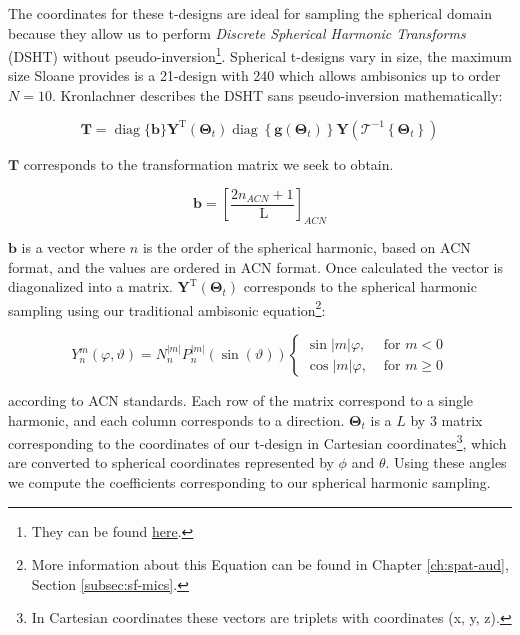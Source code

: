
The coordinates for these t-designs are ideal for sampling the spherical domain because they allow us to perform \textit{Discrete Spherical Harmonic Transforms} (DSHT) without pseudo-inversion\footnote{They can be found \href{http://neilsloane.com/sphdesigns/}{here}.}. Spherical t-designs vary in size, the maximum size Sloane provides is a 21-design with 240 which allows ambisonics up to order $N = 10$. Kronlachner describes the DSHT sans pseudo-inversion mathematically:

\begin{equation}
\boldsymbol{T}=\operatorname{diag}\{\boldsymbol{b}\} \boldsymbol{Y}^{\mathrm{T}}\left(\boldsymbol{\Theta}_{t}\right) \operatorname{diag}\left\{\boldsymbol{g}\left(\boldsymbol{\Theta}_{t}\right)\right\} \boldsymbol{Y}\left(\mathcal{T}^{-1}\left\{\boldsymbol{\Theta}_{t}\right\}\right)
\end{equation}
 
$\textbf{T}$ corresponds to the transformation matrix we seek to obtain.

\begin{equation}
\boldsymbol{b}=\left[\frac{2 n_{A C N}+1}{\mathrm{~L}}\right]_{A C N}
\end{equation}

$\boldsymbol{b}$ is a vector where $n$ is the order of the spherical harmonic, based on ACN format, and the values are ordered in ACN format. Once calculated the vector is diagonalized into a matrix. $\boldsymbol{Y}^{\mathrm{T}}\left(\boldsymbol{\Theta}_{t}\right)$ corresponds to the spherical harmonic sampling using our traditional ambisonic equation\footnote{More information about this Equation can be found in Chapter \ref{ch:spat-aud}, Section \ref{subsec:sf-mics}.}:

$$
Y_{n}^{m}(\varphi, \vartheta)=N_{n}^{|m|} P_{n}^{|m|}(\sin (\vartheta))\left\{\begin{array}{ll}
\sin |m| \varphi, & \text { for } m<0 \\
\cos |m| \varphi, & \text { for } m \geq 0
\end{array}\right.
$$


according to ACN standards. Each row of the matrix correspond to a single harmonic, and each column corresponds to a direction. $\boldsymbol{\Theta}_{t}$ is a $L$ by 3 matrix corresponding to the coordinates of our t-design in Cartesian coordinates\footnote{In Cartesian coordinates these vectors are triplets with coordinates (x, y, z).}, which are converted to spherical coordinates represented by $\phi$ and $\theta$. Using these angles we compute the coefficients corresponding to our spherical harmonic sampling. 


